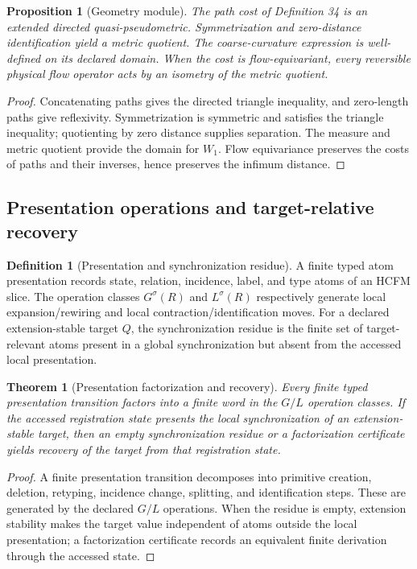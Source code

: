 \documentclass[11pt]{article}
\newtheorem{theorem}{Theorem}
\newtheorem{proposition}{Proposition}
\theoremstyle{definition}
\newtheorem{definition}{Definition}
\begin{document}
\begin{proposition}[Geometry module]
The path cost of Definition 34 is an extended directed quasi-pseudometric. Symmetrization and zero-distance identification yield a metric quotient. The coarse-curvature expression is well-defined on its declared domain. When the cost is flow-equivariant, every reversible physical flow operator acts by an isometry of the metric quotient.
\end{proposition}

\begin{proof}
Concatenating paths gives the directed triangle inequality, and zero-length paths give reflexivity. Symmetrization is symmetric and satisfies the triangle inequality; quotienting by zero distance supplies separation. The measure and metric quotient provide the domain for $W_1$. Flow equivariance preserves the costs of paths and their inverses, hence preserves the infimum distance.
\end{proof}

\subsection{Presentation operations and target-relative recovery}

\begin{definition}[Presentation and synchronization residue]
A finite typed atom presentation records state, relation, incidence, label, and type atoms of an HCFM slice. The operation classes $G^{\sigma}(R)$ and $L^{\sigma}(R)$ respectively generate local expansion/rewiring and local contraction/identification moves. For a declared extension-stable target $Q$, the synchronization residue is the finite set of target-relevant atoms present in a global synchronization but absent from the accessed local presentation.
\end{definition}

\begin{theorem}[Presentation factorization and recovery]
\label{thm:presentation-factorization}
Every finite typed presentation transition factors into a finite word in the $G/L$ operation classes. If the accessed registration state presents the local synchronization of an extension-stable target, then an empty synchronization residue or a factorization certificate yields recovery of the target from that registration state.
\end{theorem}

\begin{proof}
A finite presentation transition decomposes into primitive creation, deletion, retyping, incidence change, splitting, and identification steps. These are generated by the declared $G/L$ operations. When the residue is empty, extension stability makes the target value independent of atoms outside the local presentation; a factorization certificate records an equivalent finite derivation through the accessed state.
\end{proof}
\end{document}

